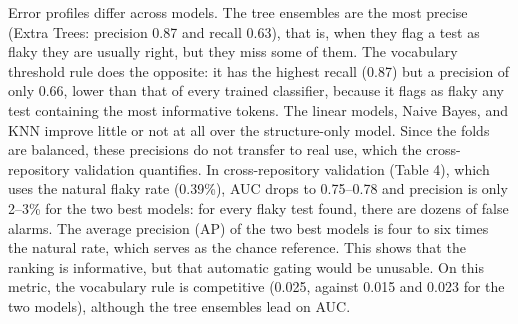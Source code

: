 Error profiles differ across models. The tree ensembles are the most precise (Extra Trees: precision 0.87 and recall 0.63), that is, when they flag a test as flaky they are usually right, but they miss some of them. The vocabulary threshold rule does the opposite: it has the highest recall (0.87) but a precision of only 0.66, lower than that of every trained classifier, because it flags as flaky any test containing the most informative tokens. The linear models, Naive Bayes, and KNN improve little or not at all over the structure-only model. Since the folds are balanced, these precisions do not transfer to real use, which the cross-repository validation quantifies.
In cross-repository validation (Table 4), which uses the natural flaky rate (0.39\%), AUC drops to 0.75--0.78 and precision is only 2--3\% for the two best models: for every flaky test found, there are dozens of false alarms. The average precision (AP) of the two best models is four to six times the natural rate, which serves as the chance reference. This shows that the ranking is informative, but that automatic gating would be unusable. On this metric, the vocabulary rule is competitive (0.025, against 0.015 and 0.023 for the two models), although the tree ensembles lead on AUC.

